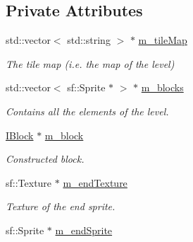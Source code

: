 \subsection*{Private Attributes}
\begin{DoxyCompactItemize}
\item 
\hypertarget{class_level_two_a11ce0acdf2194208efcd706072a7ac6e}{std\-::vector$<$ std\-::string $>$ $\ast$ \hyperlink{class_level_two_a11ce0acdf2194208efcd706072a7ac6e}{m\-\_\-tile\-Map}}\label{class_level_two_a11ce0acdf2194208efcd706072a7ac6e}

\begin{DoxyCompactList}\small\item\em The tile map (i.\-e. the map of the level) \end{DoxyCompactList}\item 
\hypertarget{class_level_two_a05265df20ffedbd210a8bfdc7d20b350}{std\-::vector$<$ sf\-::\-Sprite $\ast$ $>$ $\ast$ \hyperlink{class_level_two_a05265df20ffedbd210a8bfdc7d20b350}{m\-\_\-blocks}}\label{class_level_two_a05265df20ffedbd210a8bfdc7d20b350}

\begin{DoxyCompactList}\small\item\em Contains all the elements of the level. \end{DoxyCompactList}\item 
\hypertarget{class_level_two_a6fda76adfb5f433935e26a25fa89cae5}{\hyperlink{class_i_block}{I\-Block} $\ast$ \hyperlink{class_level_two_a6fda76adfb5f433935e26a25fa89cae5}{m\-\_\-block}}\label{class_level_two_a6fda76adfb5f433935e26a25fa89cae5}

\begin{DoxyCompactList}\small\item\em Constructed block. \end{DoxyCompactList}\item 
\hypertarget{class_level_two_a67e50c63f7bd5805014d91c9acd44ef0}{sf\-::\-Texture $\ast$ \hyperlink{class_level_two_a67e50c63f7bd5805014d91c9acd44ef0}{m\-\_\-end\-Texture}}\label{class_level_two_a67e50c63f7bd5805014d91c9acd44ef0}

\begin{DoxyCompactList}\small\item\em Texture of the end sprite. \end{DoxyCompactList}\item 
\hypertarget{class_level_two_a8aed4e19d7cd859464602625d1f701ac}{sf\-::\-Sprite $\ast$ \hyperlink{class_level_two_a8aed4e19d7cd859464602625d1f701ac}{m\-\_\-end\-Sprite}}\label{class_level_two_a8aed4e19d7cd859464602625d1f701ac}


\end{DoxyCompactItemize}
